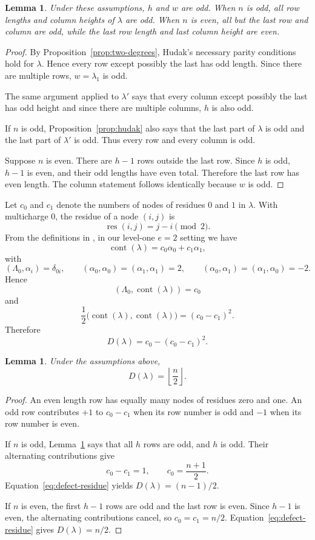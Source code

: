 \documentclass[11pt,reqno]{amsart}
\numberwithin{equation}{section}
\newtheorem{lemma}[theorem]{Lemma}
\theoremstyle{remark}
\begin{document}
\begin{lemma}\label{lem:parity-pattern}
Under these assumptions, $h$ and $w$ are odd.  When $n$ is odd, all
row lengths and column heights of $\lambda$ are odd.  When $n$ is even,
all but the last row and column are odd, while the last row length and
last column height are even.
\end{lemma}

\begin{proof}
By Proposition~\ref{prop:two-degrees}, Hudak's necessary parity conditions hold for $\lambda$.  Hence every row except possibly the last has odd length.  Since there are multiple rows, $w=\lambda_1$ is odd.

The same argument applied to $\lambda'$ says that every column except possibly the last has odd height and since there are multiple columns,  $h$ is also odd.

If $n$ is odd, Proposition~\ref{prop:hudak} also says that the last part of $\lambda$ is odd and the last part of $\lambda'$ is odd.  Thus every row and every column is odd.

Suppose $n$ is even. There are $h-1$ rows outside the last row.  Since $h$ is odd, $h-1$ is even, and their odd lengths have even total.  Therefore the last row has even length.  The column statement follows identically because $w$ is odd.
\end{proof}

Let $c_0$ and $c_1$ denote the numbers of nodes of residues $0$ and
$1$ in $\lambda$.  With multicharge $0$, the residue of a node $(i,j)$ is
\[
\operatorname{res}(i,j)=j-i\pmod 2.
\]
From the definitions in
\cite[(2.1), (2.4), (2.5), (2.7)]{KMR}, in our level-one $e=2$
setting we have
\[
\operatorname{cont}(\lambda)=c_0\alpha_0+c_1\alpha_1,
\]
with
\[
(\Lambda_0,\alpha_i)=\delta_{0i},
\qquad
(\alpha_0,\alpha_0)=(\alpha_1,\alpha_1)=2,
\qquad
(\alpha_0,\alpha_1)=(\alpha_1,\alpha_0)=-2.
\]
Hence
\[
(\Lambda_0,\operatorname{cont}(\lambda))=c_0
\]
and
\[
\frac12
\bigl(\operatorname{cont}(\lambda),
      \operatorname{cont}(\lambda)\bigr)
=(c_0-c_1)^2.
\]
Therefore
\begin{equation}\label{eq:defect-residue}
D(\lambda)=c_0-(c_0-c_1)^2.
\end{equation}
\begin{lemma}\label{lem:defect}
Under the assumptions above,
\[
D(\lambda)=\left\lfloor\frac n2\right\rfloor.
\]
\end{lemma}

\begin{proof}
An even length row has equally many nodes of residues zero and one.  An odd row contributes $+1$ to $c_0-c_1$ when its row number is odd and $-1$ when its row number is even.

If $n$ is odd, Lemma~\ref{lem:parity-pattern} says that all $h$ rows are odd, and $h$ is odd.  Their alternating contributions give
\[
c_0-c_1=1,
\qquad
c_0=\frac{n+1}{2}.
\]
Equation~\eqref{eq:defect-residue} yields $D(\lambda)=(n-1)/2$.

If $n$ is even, the first $h-1$ rows are odd and the last row is even.  Since $h-1$ is even, the alternating contributions cancel, so $c_0=c_1=n/2$.  Equation~\eqref{eq:defect-residue} gives $D(\lambda)=n/2$.
\end{proof}
\end{document}
